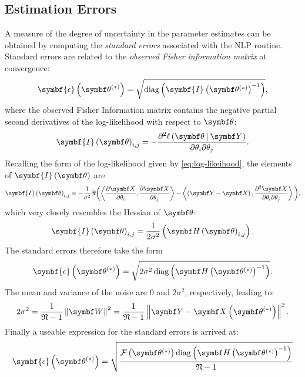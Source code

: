 \subsection{Estimation Errors}
\label{subsec:errors}
A measure of the degree of uncertainty in the parameter estimates can be obtained
by computing the \emph{standard errors} associated with the \ac{NLP} routine.
Standard errors are related  to the \emph{observed Fisher information matrix}
at convergence\cite[Section 2.7]{Pawitan2001}:
\begin{equation}
    \symbf{\epsilon}\left(\bthstar\right) = \sqrt{\diag\left(\symbf{I}\left( \bthstar \right)^{-1}\right)},
\end{equation}
where the observed Fisher Information matrix contains the negative partial second
derivatives of the log-likelihood with respect to $\bth$:
\begin{equation}
    \symbf{I}\left(\bth\right)_{i, j} =
        -\frac
        {\partial^2 \ell \left( \bdthY \right)}
        {\partial \theta_i \partial \theta_j}.
\end{equation}
Recalling the form of the log-likelihood given by \cref{eq:log-likeihood},
the elements of $\symbf{I}\left(\bth\right)$ are
\begin{equation}
    \symbf{I}\left(\bth\right)_{i, j} =
        -\frac{1}{\sigma^2}
        \Re
        \biggl(
            \left\langle
                \frac{\partial \bX}{\partial \theta_i},
                \frac{\partial \bX}{\partial \theta_j}
            \right\rangle
            -
            \left\langle
                \left(\bY - \bX\right),
                \frac{\partial^2 \bX}{\partial \theta_i \partial \theta_j}
            \right\rangle
        \biggl),
\end{equation}
which very closely resembles the Hessian of $\bth$:
\begin{equation}
    \symbf{I}\left(\bth\right)_{i,j} =
        \frac{1}{2 \sigma^2} \left(
            \bdHth_{i,j}
        \right).
\end{equation}
The standard errors therefore take the form
\begin{equation}
    \symbf{\epsilon}\left(\bthstar\right) =
        \sqrt{
            2\sigma^2 \diag \left(
                \bdHthstar^{-1}
            \right)
        }.
\end{equation}
The mean and variance of the noise are $0$ and $2\sigma^2$, respectively,
leading to:
\begin{equation}
    2 \sigma^2 = \frac{1}{\mathfrak{N} - 1}
    \left\lVert \bW \right\rVert^2 =
    \frac{1}{\mathfrak{N} - 1} \left \lVert
        \bY - \bXthstar
    \right \rVert^2.
\end{equation}
Finally a useable expression for the standard errors is arrived at:
\begin{equation}
    \symbf{\epsilon}\left(\bthstar\right) =
        \sqrt{
            \frac
            {
                \Fthstar \diag \left(
                    \bdHthstar^{-1}
                \right)
            }
            {\mathfrak{N} - 1}
        }
\end{equation}

